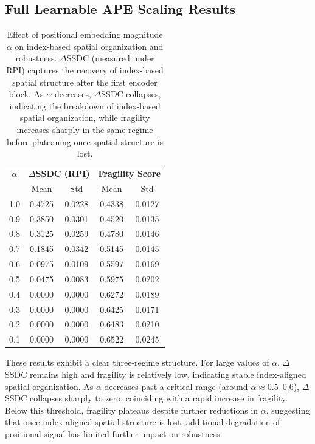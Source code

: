 \documentclass{article}
\begin{document}
  \subsection{Full Learnable APE Scaling Results}
    \begin{table}[H]
      \centering
      \small
      \begin{tabular}{c|cc|cc}
      \toprule
      \textbf{$\alpha$} & \multicolumn{2}{c|}{\textbf{$\Delta$SSDC (RPI)}} & \multicolumn{2}{c}{\textbf{Fragility Score}} \\
      & Mean & Std & Mean & Std \\
      \midrule
      1.0 & 0.4725 & 0.0228 & 0.4338 & 0.0127 \\
      0.9 & 0.3850 & 0.0301 & 0.4520 & 0.0135 \\
      0.8 & 0.3125 & 0.0259 & 0.4780 & 0.0146 \\
      0.7 & 0.1845 & 0.0342 & 0.5145 & 0.0145 \\
      0.6 & 0.0975 & 0.0109 & 0.5597 & 0.0169 \\
      0.5 & 0.0475 & 0.0083 & 0.5975 & 0.0202 \\
      0.4 & 0.0000 & 0.0000 & 0.6272 & 0.0189 \\
      0.3 & 0.0000 & 0.0000 & 0.6425 & 0.0171 \\
      0.2 & 0.0000 & 0.0000 & 0.6483 & 0.0210 \\
      0.1 & 0.0000 & 0.0000 & 0.6522 & 0.0245 \\
      \bottomrule
      \end{tabular}
      \caption{
      Effect of positional embedding magnitude $\alpha$ on index-based spatial organization and robustness.
      $\Delta$SSDC (measured under RPI) captures the recovery of index-based spatial structure after the first encoder block.
      As $\alpha$ decreases, $\Delta$SSDC collapses, indicating the breakdown of index-based spatial organization, while fragility increases sharply in the same regime before plateauing once spatial structure is lost.
      }
      \label{tab:pe_scaling_full}
    \end{table}

    These results exhibit a clear three-regime structure. For large values of $\alpha$, $\Delta$SSDC remains high and fragility is relatively low, indicating stable index-aligned spatial organization. As $\alpha$ decreases past a critical range (around $\alpha \approx 0.5$–$0.6$), $\Delta$SSDC collapses sharply to zero, coinciding with a rapid increase in fragility. Below this threshold, fragility plateaus despite further reductions in $\alpha$, suggesting that once index-aligned spatial structure is lost, additional degradation of positional signal has limited further impact on robustness.
\end{document}
